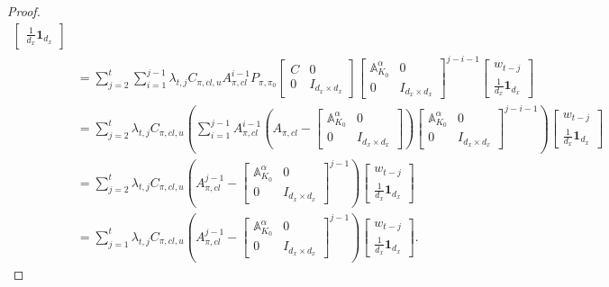 \begin{proof}
\begin{align*}
\begin{bmatrix}
    \frac{1}{d_x}\mathbf{1}_{d_x}
\end{bmatrix}\\
&= \sum_{j=2}^t \sum_{i=1}^{j-1} \lambda_{t,j} C_{\pi,cl,u} A_{\pi,cl}^{i-1} P_{\pi,\pi_0} \begin{bmatrix}
    C & 0 \\ 0 & I_{d_x\times d_x}
\end{bmatrix} \begin{bmatrix}
    \mathbb{A}_{K_0}^{\alpha} & 0 \\ 0 & I_{d_x\times d_x}
\end{bmatrix}^{j-i-1} \begin{bmatrix}
    w_{t-j} \\ \frac{1}{d_x}\mathbf{1}_{d_x}
\end{bmatrix}\\
&=\sum_{j=2}^t \lambda_{t,j} C_{\pi,cl,u} \left( \sum_{i=1}^{j-1} A_{\pi,cl}^{i-1} \left(A_{\pi,cl}-\begin{bmatrix}
    \mathbb{A}_{K_0}^{\alpha} & 0 \\ 0 & I_{d_x\times d_x}
\end{bmatrix}\right) \begin{bmatrix}
    \mathbb{A}_{K_0}^{\alpha} & 0 \\ 0 & I_{d_x\times d_x}
\end{bmatrix}^{j-i-1} \right)\begin{bmatrix}
    w_{t-j} \\ \frac{1}{d_x}\mathbf{1}_{d_x}
\end{bmatrix}\\
&= \sum_{j=2}^t \lambda_{t,j} C_{\pi,cl,u} \left( A_{\pi,cl}^{j-1} - \begin{bmatrix}
    \mathbb{A}_{K_0}^{\alpha} & 0 \\ 0 & I_{d_x\times d_x}
\end{bmatrix}^{j-1} \right)\begin{bmatrix}
    w_{t-j} \\ \frac{1}{d_x}\mathbf{1}_{d_x}
\end{bmatrix}\\
&=\sum_{j=1}^t \lambda_{t,j} C_{\pi,cl,u} \left( A_{\pi,cl}^{j-1} - \begin{bmatrix}
    \mathbb{A}_{K_0}^{\alpha} & 0 \\ 0 & I_{d_x\times d_x}
\end{bmatrix}^{j-1} \right)\begin{bmatrix}
    w_{t-j} \\ \frac{1}{d_x}\mathbf{1}_{d_x}
\end{bmatrix}.

\end{align*}
\end{proof}
